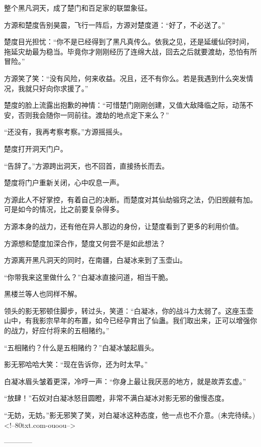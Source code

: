 \begin{this_body}
整个黑凡洞天，成了楚门和百足家的联盟象征。

方源和楚度告别昊震，飞行一阵后，方源对楚度道：“好了，不必送了。”

楚度目光担忧：“你不是已经得到了黑凡真传么。依我之见，还是延缓仙窍时间，拖延灾劫最为稳当。毕竟你才刚刚经历了连绵大战，回去之后就要渡劫，恐怕有所冒险。”

方源笑了笑：“没有风险，何来收益。况且，还不有你么。若是我遇到什么突发情况，我就只好向你求援了。”

楚度的脸上流露出抱歉的神情：“可惜楚门刚刚创建，又值大敌降临之际，动荡不安，否则我会随你一同前往。渡劫的地点定下来么？”

“还没有，我再考察考察。”方源摇摇头。

楚度打开洞天门户。

“告辞了。”方源跨出洞天，也不回首，直接扬长而去。

楚度将门户重新关闭，心中叹息一声。

方源此人不好掌控，有着自己的决断。而楚度对其仙劫锻窍之法，仍旧觊觎有加。可是如今的情况，比之前要复杂得多。

方源本身的战力，还有他在异人那边的身份，让楚度看到了更多的利用价值。

方源想和楚度加深合作，楚度又何尝不是如此想法？

方源离开黑凡洞天的同时，在南疆，白凝冰来到了玉壶山。

“你带我来这里做什么？”白凝冰直接问道，相当干脆。

黑楼兰等人也同样不解。

领头的影无邪顿住脚步，转过头，笑道：“白凝冰，你的战斗力太弱了。这座玉壶山中，有我影宗早年的布置，如今已经孕育出了仙蛊。我们取出来，正可以增强你的战力，好应付将来的五相赌约。”

“五相赌约？什么是五相赌约？”白凝冰皱起眉头。

影无邪哈哈大笑：“现在告诉你，还为时太早。”

白凝冰眉头皱着更深，冷哼一声：“你身上最让我厌恶的地方，就是故弄玄虚。”

“放肆！”石奴对白凝冰怒目圆瞪，非常不满白凝冰对影无邪的傲慢态度。

“无妨，无妨。”影无邪笑了笑，对白凝冰这种态度，他一点也不介意。(未完待续。)<!--80txt.com-ouoou-->

------------

\end{this_body}

